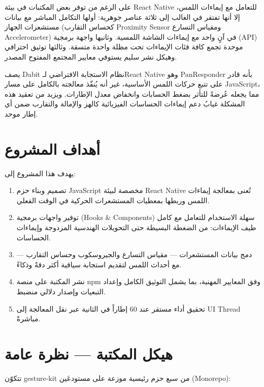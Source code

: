 \begin{Arabic}
على الرغم من توفر بعض المكتبات في بيئة \textenglish{React Native} للتعامل مع إيماءات اللمس، إلا أنها تفتقر في الغالب إلى ثلاثة عناصر جوهرية: أولها التكامل المباشر مع بيانات مستشعرات الجهاز (كحساس التقارب \textenglish{Proximity Sensor} ومقياس التسارع \textenglish{Accelerometer}) في آنٍ واحد مع إيماءات الشاشة اللمسية. وثانيها واجهة برمجية (\textenglish{API}) موحدة تجمع كافة فئات الإيماءات تحت مظلة واحدة متسقة. وثالثها توثيق احترافي وهيكل نشر سليم يستوفي معايير المجتمع المفتوح المصدر.

يصف \textenglish{Dabit} \cite{dabit2019} نظام الاستجابة الافتراضي لـ\textenglish{React Native} وهو \textenglish{PanResponder} بأنه قادر على تتبع حركات اللمس الأساسية، غير أنه يُنفّذ معالجته بالكامل على مسار \textenglish{JavaScript}، مما يجعله عُرضةً للتأثر بضغط الحسابات وانخفاض معدل الإطارات. ويزيد من تعقيد هذه المشكلة غيابُ دعم إيماءات الحساسات الفيزيائية كالهز والإمالة والتقارب ضمن أي إطار موحد.

\section{أهداف المشروع}

يهدف هذا المشروع إلى:
\begin{enumerate}
    \item تصميم وبناء حزم \textenglish{JavaScript} مخصصة لبيئة \textenglish{React Native} تُعنى بمعالجة إيماءات اللمس وربطها بمعطيات المستشعرات الحركية في الوقت الفعلي.
    \item توفير واجهات برمجية (\textenglish{Hooks \& Components}) سهلة الاستخدام للتعامل مع كامل طيف الإيماءات: من الضغطة البسيطة حتى التحويلات الهندسية المزدوجة وإيماءات الحساسات.
    \item دمج بيانات المستشعرات --- مقياس التسارع والجيروسكوب وحساس التقارب --- مع أحداث اللمس لتقديم استجابة سياقية أكثر دقةً وذكاءً.
    \item نشر المكتبة على منصة \textenglish{npm} وفق المعايير المهنية، بما يشمل التوثيق الكامل وإعداد التبعيات وإصدار دلالي منضبط.
    \item تحقيق أداء مستقر عند 60 إطاراً في الثانية عبر نقل المعالجة إلى \textenglish{UI Thread} مباشرةً.
\end{enumerate}

\section{هيكل المكتبة --- نظرة عامة}

تتكوّن \textenglish{gesture-kit} من سبع حزم رئيسية موزعة على مستودعَين (\textenglish{Monorepo}):


\end{Arabic}
